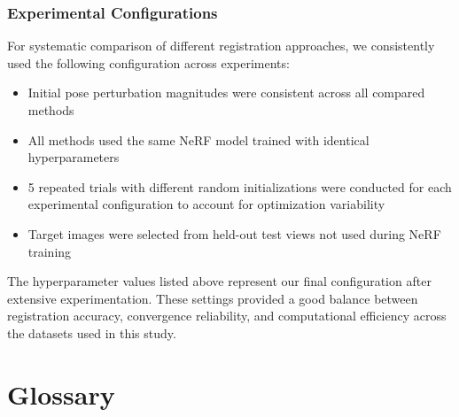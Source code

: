 \subsection{Experimental Configurations}

For systematic comparison of different registration approaches, we consistently used the following configuration across experiments:

\begin{itemize}
    \item Initial pose perturbation magnitudes were consistent across all compared methods
    \item All methods used the same NeRF model trained with identical hyperparameters
    \item 5 repeated trials with different random initializations were conducted for each experimental configuration to account for optimization variability
    \item Target images were selected from held-out test views not used during NeRF training
\end{itemize}

The hyperparameter values listed above represent our final configuration after extensive experimentation. These settings provided a good balance between registration accuracy, convergence reliability, and computational efficiency across the datasets used in this study.

\chapter{Glossary}\label{appendix:glossary}

